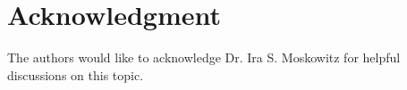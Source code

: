 \documentclass[letterpaper, 10pt]{ieeeconf}
\begin{document}

\section*{Acknowledgment}
The authors would like to acknowledge Dr. Ira S. Moskowitz for helpful discussions on this topic.







%
%
%
%


%
%
%
%
\end{document}

